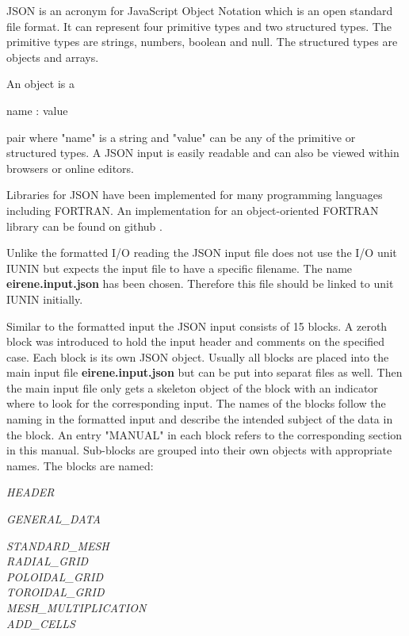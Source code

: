 JSON is an acronym for JavaScript Object Notation \cite{kn:Json} which is an open standard 
file format.  
It can represent four primitive types and  two structured types. The primitive types are
strings, numbers, boolean and null. The structured types are objects and arrays. 

An object is a

\begin{center}
name : value
\end{center}

pair where "name" is a string and "value" can be any of the primitive or structured types.
A JSON input is easily readable and can also be viewed within browsers or online editors.

Libraries for JSON have been implemented for many programming languages including
FORTRAN. An implementation for an object-oriented FORTRAN library can be found on github 
\cite{kn:Williams}.
 
Unlike the formatted I/O reading the JSON input file does not use the I/O unit IUNIN but 
expects the input file to have a specific filename. The name \textbf{eirene.input.json} has
been chosen. Therefore this file should be linked to unit IUNIN initially.

Similar to the formatted input the JSON input consists of 15 blocks. A zeroth block was
introduced to hold the input header and comments on the specified case. Each block is its own 
JSON object. Usually all blocks are placed into the main input file \textbf{eirene.input.json} 
but can be put into separat files as well. Then the main input file only gets a skeleton object of 
the block with an indicator where to look for the corresponding input. 
The names of the blocks follow the naming in the formatted input and describe the intended
subject of the data in the block. An entry "MANUAL" in each block refers to the corresponding
section in this manual. Sub-blocks are grouped into their own objects with appropriate names.
The blocks are named:

\medskip

\textsl{HEADER}

\medskip

\textsl{GENERAL\_DATA}

\medskip

\textsl{STANDARD\_MESH} \\
	\hspace*{1cm} \textsl{RADIAL\_GRID} \\
	\hspace*{1cm} \textsl{POLOIDAL\_GRID} \\
	\hspace*{1cm} \textsl{TOROIDAL\_GRID} \\
	\hspace*{1cm} \textsl{MESH\_MULTIPLICATION} \\
	\hspace*{1cm} \textsl{ADD\_CELLS}


